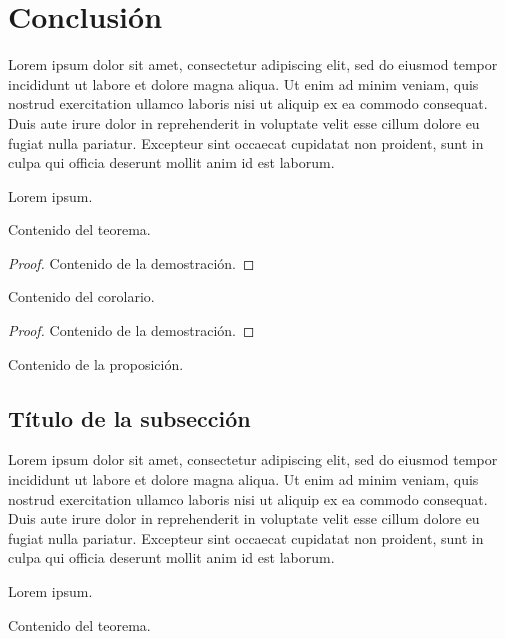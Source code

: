 \section*{Conclusión}

Lorem ipsum dolor sit amet, consectetur adipiscing elit, sed do eiusmod tempor incididunt ut labore et dolore magna aliqua. Ut enim ad minim veniam, quis nostrud exercitation ullamco laboris nisi ut aliquip ex ea commodo consequat. Duis aute irure dolor in reprehenderit in voluptate velit esse cillum dolore eu fugiat nulla pariatur. Excepteur sint occaecat cupidatat non proident, sunt in culpa qui officia deserunt mollit anim id est laborum.

Lorem ipsum.

\begin{teorema}
    Contenido del teorema.
\end{teorema}

\begin{proof}
    Contenido de la demostración.
\end{proof}

\begin{corolario}
    Contenido del corolario.
\end{corolario}

\begin{proof}
    Contenido de la demostración.
\end{proof}

\begin{proposicion}
    Contenido de la proposición.
\end{proposicion}

\subsection*{Título de la subsección}

Lorem ipsum dolor sit amet, consectetur adipiscing elit, sed do eiusmod tempor incididunt ut labore et dolore magna aliqua. Ut enim ad minim veniam, quis nostrud exercitation ullamco laboris nisi ut aliquip ex ea commodo consequat. Duis aute irure dolor in reprehenderit in voluptate velit esse cillum dolore eu fugiat nulla pariatur. Excepteur sint occaecat cupidatat non proident, sunt in culpa qui officia deserunt mollit anim id est laborum.

Lorem ipsum.

\begin{teorema}
    Contenido del teorema.
\end{teorema}

